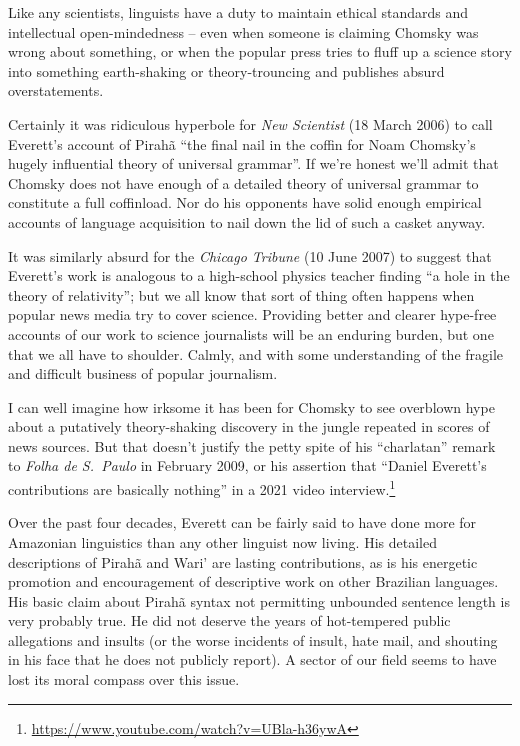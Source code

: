 \documentclass[output=paper,colorlinks,citecolor=brown
]{langscibook}
\begin{document}
Like any scientists, linguists have a duty to maintain ethical
standards and intellectual open-mindedness -- even when someone is
claiming Chomsky was wrong about something, or when the popular
press tries to fluff up a science story into something earth-shaking
or theory-trouncing and publishes absurd overstatements.

Certainly it was ridiculous hyperbole for
\textit{New Scientist} (18 March 2006)
to call Everett's account of Pirah{\~a} ``the final nail in the
coffin for Noam Chomsky's hugely influential theory of universal
grammar''. If we're honest we'll admit that Chomsky does not have
enough of a detailed theory of universal grammar to constitute a full
coffinload. Nor do his opponents have solid enough empirical accounts
of language acquisition to nail down the lid of such a casket anyway.

It was similarly absurd for the
\textit{Chicago Tribune} (10 June 2007)
to suggest that Everett's work is analogous to a high-school physics
teacher finding ``a hole in the theory of relativity''; but we all know
that sort of thing often happens when popular news media try to cover
science. Providing better and clearer hype-free accounts of our work
to science journalists will be an enduring burden, but one that we
all have to shoulder. Calmly, and with some understanding of the
fragile and difficult business of popular journalism.

I can well imagine how irksome it has been for Chomsky to see overblown
hype about a putatively theory-shaking discovery in the jungle repeated
in scores of news sources. But that doesn't justify the petty spite of
his ``charlatan'' remark to \textit{Folha de S.~Paulo} in February 2009,
or his assertion that ``Daniel Everett's contributions are basically
nothing'' in a 2021 video interview.\footnote{\label{basicallynothing}
   \url{https://www.youtube.com/watch?v=UBla-h36ywA}}

Over the past four decades, Everett can be fairly said to have done
more for Amazonian linguistics than any other linguist now living.
His detailed descriptions of Pirah{\~a} and Wari' are lasting
contributions, as is his energetic promotion and encouragement of
descriptive work on other Brazilian languages. His basic claim about
Pirah{\~a} syntax not permitting unbounded sentence length is very
probably true. He did not deserve the years of hot-tempered public
allegations and insults (or the worse incidents of insult, hate mail,
and shouting in his face that he does not publicly report). A sector
of our field seems to have lost its moral compass over this issue.
\end{document}
